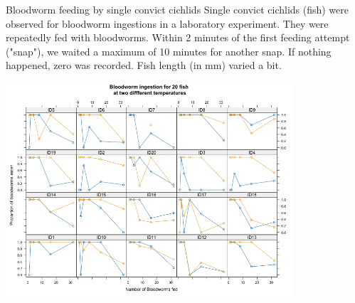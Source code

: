 \documentclass{beamer}
\begin{document}
\begin{frame}{Bloodworm feeding by single convict cichlids }
    \footnotesize Single convict cichlids (fish) were observed for bloodworm ingestions in a laboratory experiment. They were repeatedly fed with bloodworms. Within 2 minutes of the first feeding attempt ("snap"), we waited a maximum of 10 minutes for another snap. If nothing happened, zero was recorded. Fish length (in mm) varied a bit.

    \begin{center}
        \includegraphics[width=0.8\textwidth]{lectures/day_10_GLMMs/figures/bloodworms.png}
    \end{center}
    
\end{frame}
\end{document}
